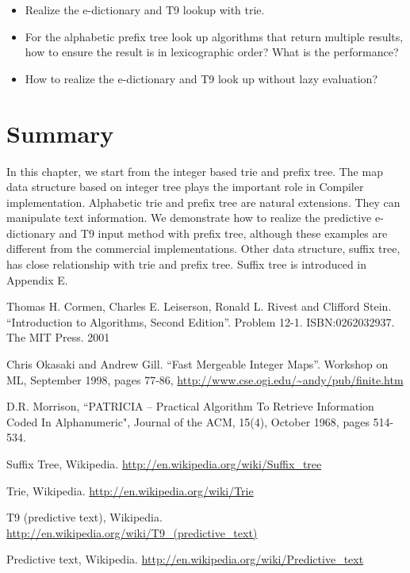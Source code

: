 \documentclass{article}
\begin{document}
\begin{Exercise}
\begin{itemize}
\item Realize the e-dictionary and T9 lookup with trie.
\item For the alphabetic prefix tree look up algorithms that return multiple results, how to ensure the result is in lexicographic order? What is the performance?
\item How to realize the e-dictionary and T9 look up without lazy evaluation?
\end{itemize}
\end{Exercise}

\section{Summary}

In this chapter, we start from the integer based trie and prefix tree. The
map data structure based on integer tree plays the important role
in Compiler implementation. Alphabetic trie and prefix tree are
natural extensions. They can manipulate text information.
We demonstrate how to realize the predictive e-dictionary
and T9 input method with prefix tree, although these examples
are different from the commercial implementations.
Other data structure, suffix tree, has close
relationship with trie and prefix tree. Suffix tree is introduced
in Appendix E.

\begin{thebibliography}{99}

Thomas H. Cormen, Charles E. Leiserson, Ronald L. Rivest and Clifford Stein.
``Introduction to Algorithms, Second Edition''. Problem 12-1. ISBN:0262032937. The MIT Press. 2001

Chris Okasaki and Andrew Gill. ``Fast Mergeable Integer
Maps''. Workshop on ML, September 1998, pages 77-86, \url{http://www.cse.ogi.edu/~andy/pub/finite.htm}

D.R. Morrison, ``PATRICIA -- Practical Algorithm To Retrieve  Information Coded In Alphanumeric", Journal of the ACM, 15(4), October 1968, pages 514-534.

Suffix Tree, Wikipedia. \url{http://en.wikipedia.org/wiki/Suffix_tree}

Trie, Wikipedia. \url{http://en.wikipedia.org/wiki/Trie}

T9 (predictive text), Wikipedia. \url{http://en.wikipedia.org/wiki/T9_(predictive_text)}

Predictive text,
Wikipedia. \url{http://en.wikipedia.org/wiki/Predictive_text}

\end{thebibliography}

\ifx\wholebook\relax\else
\end{document}
